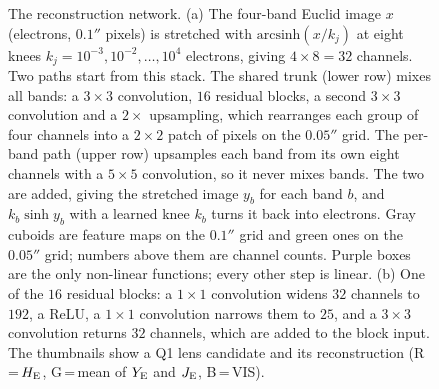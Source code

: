\begin{figure}
\caption{The reconstruction network.
(a) The four-band Euclid image $x$ (electrons, $0.1''$ pixels) is stretched with $\mathrm{arcsinh}(x/k_j)$ at eight knees $k_j = 10^{-3}, 10^{-2}, \ldots, 10^{4}$ electrons, giving $4\times8=32$ channels.
Two paths start from this stack.
The shared trunk (lower row) mixes all bands: a $3\times3$ convolution, $16$ residual blocks, a second $3\times3$ convolution and a $2\times$ upsampling, which rearranges each group of four channels into a $2\times2$ patch of pixels on the $0.05''$ grid.
The per-band path (upper row) upsamples each band from its own eight channels with a $5\times5$ convolution, so it never mixes bands.
The two are added, giving the stretched image $y_b$ for each band $b$, and $k_b \sinh y_b$ with a learned knee $k_b$ turns it back into electrons.
Gray cuboids are feature maps on the $0.1''$ grid and green ones on the $0.05''$ grid; numbers above them are channel counts.
Purple boxes are the only non-linear functions; every other step is linear.
(b) One of the $16$ residual blocks: a $1\times1$ convolution widens $32$ channels to $192$, a ReLU, a $1\times1$ convolution narrows them to $25$, and a $3\times3$ convolution returns $32$ channels, which are added to the block input.
The thumbnails show a Q1 lens candidate and its reconstruction (R\,=\,$H_{\rm E}$, G\,=\,mean of $Y_{\rm E}$ and $J_{\rm E}$, B\,=\,VIS).}
\label{fig:architecture}
\end{figure}
